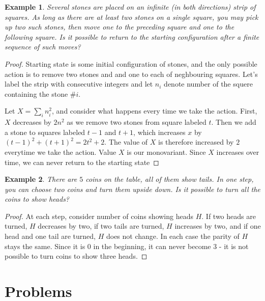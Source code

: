 \documentclass[11pt,a5paper]{article}
\newtheorem{theorem}{Example}
\begin{document}
\begin{theorem}
	Several stones are placed on an infinite (in both directions) strip of squares. As long as there are at least two stones on a single square, you may pick up two such stones, then move one to the preceding square and one to the following square. Is it possible to return to the starting configuration after a finite sequence of such moves?
\end{theorem}
\begin{proof}
	Starting state is some initial configuration of stones, and the only possible action is to remove two stones and and one to each of neghbouring squares.
	Let's label the strip with consecutive integers and let $n_i$ denote number of the squere containing the stone $\#i$. 
	
	Let $X = \sum_{i}{n_i^2}$, and consider what happens every time we take the action. First, $X$ decreases by $2n^2$ as we remove two stones from square labeled $t$. Then we add a stone to squares labeled $t-1$ and $t+1$, which increases $x$ by $(t-1)^2 + (t+1)^2 = 2t^2 + 2$. The value of $X$ is therefore increased by $2$ everytime we take the action. Value $X$ is our monovariant. Since $X$ increases over time, we can never return to the starting state
\end{proof}

\begin{theorem}
	There are $5$ coins on the table, all of them show tails. In one step, you can choose two coins and turn them upside down. Is it possible to turn all the coins to show heads?
\end{theorem}	
\begin{proof}
	At each step, consider number of coins showing heads $H$. If two heads are turned, $H$ decreases by two, if two tails are turned, $H$ increases by two, and if one head and one tail are turned, $H$ does not change. In each case the parity of $H$ stays the same. Since it is $0$ in the beginning, it can never become $3$ - it is not possible to turn coins to show three heads. 
\end{proof}

\section{Problems}
\end{document}
